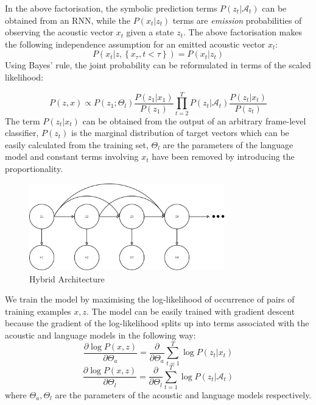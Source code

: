 \documentclass{article}
\begin{document}
In the above factorisation, the symbolic prediction terms $P(z_t|\mathcal{A}_t)$ can be obtained from an RNN, while the $P(x_t|z_t)$ terms are \emph{emission} probabilities of observing the acoustic vector $x_t$ given a state $z_t$. The above factorisation makes the following independence assumption for an emitted acoustic vector $x_t$:
\begin{equation}
\label{independence}
P(x_t | z, \left\{ x_{\tau} , t < \tau \right\}) = P(x_t | z_t)
\end{equation}
Using Bayes' rule, the joint probability can be reformulated in terms of the scaled likelihood:

\begin{equation}
P(z,x) \propto P(z_1;\Theta_l) \frac{P(z_1|x_{1})}{P(z_1)} \prod_{t=2}^{T} P(z_t|\mathcal{A}_t) \frac{P(z_t|x_t)}{P(z_t)}
\end{equation}
The term $P(z_t|x_t)$ can be obtained from the output of an arbitrary frame-level classifier, $P(z_t)$ is the marginal distribution of target vectors which can be easily calculated from the training set, $\Theta_l$ are the parameters of the language model and constant terms involving $x_t$ have been removed by introducing the proportionality. 

\begin{figure}[]
\begin{minipage}[b]{1.0\linewidth}
  \centering
  \centerline{\includegraphics[width=8.5cm]{graph.png}}
\end{minipage}
\label{fig:res}
\caption{Hybrid Architecture}
\end{figure}

We train the model by maximising the log-likelihood of occurrence of pairs of training examples $x,z$. The model can be easily trained with gradient descent because the gradient of the log-likelihood splits up into terms associated with the acoustic and language models in the following way:
\begin{equation}
\label{train_1}
\frac{\partial \log P(x,z)}{\partial \Theta_a} = \frac{\partial}{\partial \Theta_a} \sum_{t=1}^T \log P(z_t|x_t)
\end{equation}
\begin{equation}
\label{train_2}
\frac{\partial \log P(x,z)}{\partial \Theta_l} = \frac{\partial}{\partial \Theta_l} \sum_{t=1}^T \log P(z_t|\mathcal A_t)
\end{equation}
where $\Theta_a,\Theta_l$ are the parameters of the acoustic and language models respectively. 
\end{document}
